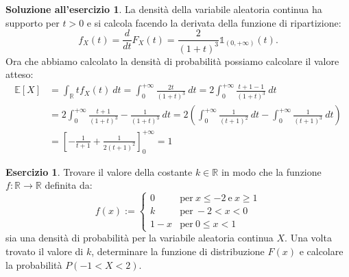 \documentclass[12pt,a4paper]{article}
\theoremstyle{definition}
\newtheorem{sol}{Soluzione all'esercizio}
\newtheorem{exe}{Esercizio}
\newcommand{\numberset}{\mathbb}
\newcommand{\R}{\numberset{R}}
\begin{document}
\begin{sol}
	La densità della variabile aleatoria continua ha supporto per $ t>0 $ e si calcola facendo la derivata della funzione di ripartizione:
	\[ f_{X}(t) = \frac{d}{dt} F_{X}(t) = \frac{2}{(1+t)^3}\mathds{1}_{(0, +\infty)}(t). \]
	Ora che abbiamo calcolato la densità di probabilità possiamo calcolare il valore atteso:
	\[ \begin{split}
			\mathbb{E}[X] & = \int_{\mathbb{R}}tf_{X}(t) \ dt = \int_{0}^{+\infty} \frac{2t}{(1+t)^3} \ dt = 2 \int_{0}^{+\infty}\frac{t+1-1}{(1+t)^3} \ dt                                          \\
			              & = 2 \int_{0}^{+\infty}\frac{t+1}{(1+t)^3} - \frac{1}{(1+t)^3} \ dt =  2\left(  \int_{0}^{+\infty}\frac{1}{(t+1)^2}\ dt - \int_{0}^{+\infty}\frac{1}{(t+1)^3} \ dt\right) \\
			              & = \left[-\frac{1}{t+1} + \frac{1}{2(t+1)^2}\right]_{0}^{+\infty} = 1
		\end{split} \]
\end{sol}

\begin{exe}
	Trovare il valore della costante $ k \in \R $ in modo che la funzione $ f : \R \to \R $ definita da:
	\[ f(x) := \begin{cases}
			0   & \mbox{per}\ x \le -2 \ \mbox{e}\ x \ge 1 \\
			k   & \mbox{per}\ -2<x<0                       \\
			1-x & \mbox{per}\ 0 \le x <1
		\end{cases} \]
	sia una densità di probabilità per la variabile aleatoria continua $ X $. Una volta trovato il valore di $ k $, determinare la funzione di distribuzione $ F(x) $ e calcolare la probabilità $ P(-1<X<2) $.
\end{exe}
\end{document}
